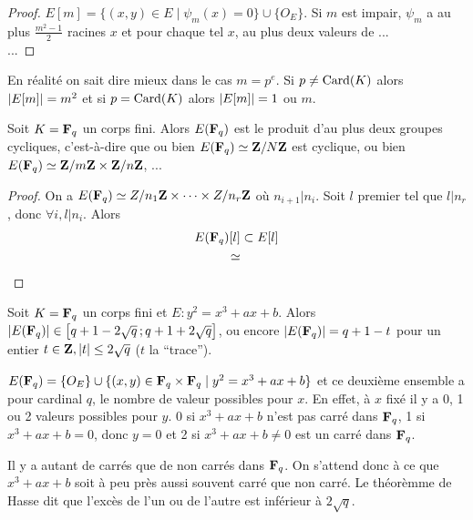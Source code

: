 	\begin{proof}
		$E[m] = \{ (x,y) \in E \mid \psi_m(x) = 0 \} \cup \{ O_E \}$.
		Si $m$ est impair, $\psi_m$ a au plus $\frac{m^2 - 1}{2}$ racines $x$ et pour chaque tel $x$, au plus deux valeurs de ...\\
		...%
	\end{proof}
	
	\begin{rem}
		En réalité on sait dire mieux dans le cas $m = p^e$.
		Si $p \neq \operatorname{Card}(K)$ alors $\left\lvert E[m]\right\rvert = m^2$ et si $p = \operatorname{Card}(K)$ alors $\left\lvert E[m]\right\rvert = 1$ ou $m$.
	\end{rem}
	
	\begin{cor}
		Soit $K = \mathbf{F}_q$ un corps fini.
		Alors $E(\mathbf{F}_q)$ est le produit d'au plus deux groupes cycliques, c'est-à-dire que ou bien $E(\mathbf{F}_q) \simeq \mathbf{Z} / N\mathbf{Z}$ est cyclique, ou bien $E(\mathbf{F}_q) \simeq \mathbf{Z} / m\mathbf{Z} \times \mathbf{Z} / n\mathbf{Z}$, ...%
	\end{cor}
	
	\begin{proof}
		On a $E(\mathbf{F}_q) \simeq Z / n_1\mathbf{Z} \times \cdots \times Z / n_r\mathbf{Z}$ où $n_{i + 1} | n_i$.
		Soit $l$ premier tel que $l | n_r$, donc $\forall i, l | n_i$.
		Alors
		\begin{align*}
		E(\mathbf{F}_q)[l] & \subset E[l]\\
		\quad \simeq & 
		\end{align*}
	\end{proof}
	
	\begin{thm}[de Hasse]
		Soit $K = \mathbf{F}_q$ un corps fini et $E : y^2 = x^3 + ax + b$.
		Alors $\left\lvert E(\mathbf{F}_q)\right\rvert \in \mathopen{}\mathclose{\left[q + 1 - 2 \sqrt{q}\mathclose{}\mathpunct{};q + 1 + 2 \sqrt{q}\right]}$, ou encore $\left\lvert E(\mathbf{F}_q)\right\rvert = q + 1 - t$ pour un entier $t \in \mathbf{Z}, \left\lvert t\right\rvert \leq 2 \sqrt{q}$ ($t$ la “trace”).
	\end{thm}
	
	\begin{rem}
		$E(\mathbf{F}_q) = \{ O_E \} \cup \{ (x,y) \in \mathbf{F}_q \times \mathbf{F}_q \mid y^2 = x^3 + ax + b \}$ et ce deuxième ensemble a pour cardinal $q$, le nombre de valeur possibles pour $x$.
		En effet, à $x$ fixé il y a 0, 1 ou 2 valeurs possibles pour $y$.
		0 si $x^3 + ax + b$ n'est pas carré dans $\mathbf{F}_q$, 1 si $x^3 + ax + b = 0$, donc $y = 0$ et 2 si $x^3 + ax + b \neq  0$ est un carré dans $\mathbf{F}_q$.
		
		Il y a autant de carrés que de non carrés dans $\mathbf{F}_q$.
		On s'attend donc à ce que $x^3 + ax + b$ soit à peu près aussi souvent carré que non carré.
		Le théorèmme de Hasse dit que l'excès de l'un ou de l'autre est inférieur à $2 \sqrt{q}$.
	\end{rem}
	

